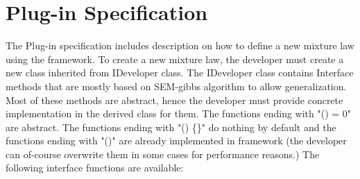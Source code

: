 \documentclass[a4paper,11pt]{article}
\begin{document}
\section{Plug-in Specification}

The Plug-in specification includes description on how to define a new mixture law using the framework.
To create a new mixture law, the developer 
must create a new class inherited from IDeveloper class. The IDeveloper class contains Interface methods that 
are mostly based on SEM-gibbs algorithm to allow generalization. Most of these methods are abstract, hence the developer must provide
concrete implementation in the derived class for them.
The functions ending with "() = 0" are abstract. The functions ending with "() \{\}" do nothing by default and the functions
ending with "()" are already implemented in framework (the developer can of-course
overwrite them in some cases for performance reasons.) The following interface functions are available:
\end{document}
